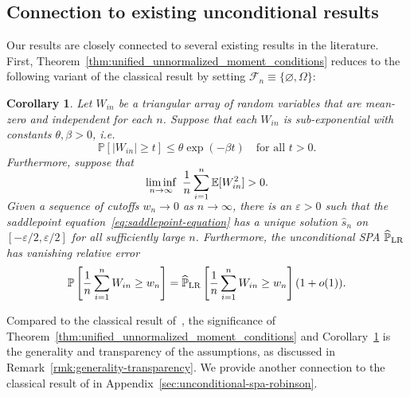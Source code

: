 \documentclass[12pt]{article}
\newtheorem{corollary}{Corollary}
\theoremstyle{definition}
\def\P{\mathbb{P}}
\def\P{\mathbb{P}}
\newcommand{\E}{\mathbb E}								%
\renewcommand{\P}{\mathbb{P}}							%
\begin{document}
  \subsection{Connection to existing unconditional results}\label{sec:connection-spa-literatures}
  
  Our results are closely connected to several existing results in the literature. First, Theorem~\ref{thm:unified_unnormalized_moment_conditions} reduces to the following variant of the classical \citet{Lugannani1980} result by setting $\mathcal{F}_n \equiv \{\varnothing,\Omega\}$:
  
  \begin{corollary}\label{cor:unconditional_LR_formula}
	  Let $W_{in}$ be a triangular array of random variables that are mean-zero and independent for each $n$. Suppose that each $W_{in}$ is sub-exponential with constants $\theta, \beta > 0$, i.e. 
	  \begin{equation} \label{eq:subexponential}
	  \P[|W_{in}| \geq t] \leq \theta \exp(-\beta t) \quad \text{for all } t > 0.
	  \end{equation} 
	  Furthermore, suppose that
	  \begin{align}  \label{eq:nondegeneracy-unconditional}
	  \smash{\liminf_{n \rightarrow \infty}\ \frac{1}{n}\sum_{i = 1}^n \E[W_{in}^2] > 0.}
	  \end{align}
	  Given a sequence of cutoffs $w_n \rightarrow 0$ as $n \rightarrow \infty$, there is an $\varepsilon > 0$ such that the saddlepoint equation~\eqref{eq:saddlepoint-equation} has a unique solution $\hat s_n$ on $[-\varepsilon/2, \varepsilon/2]$ for all sufficiently large $n$. Furthermore, the unconditional SPA $\widehat{\P}_{\textnormal{LR}}$ has vanishing relative error
	  \begin{align} \label{eq:conclusion_unconditional_saddlepoint_approximation}
	  \P\left[\frac{1}{n}\sum_{i = 1}^n W_{in} \geq w_n\right] = \widehat{\P}_{\textnormal{LR}}\left[\frac{1}{n}\sum_{i = 1}^n W_{in} \geq w_n\right](1+o(1)).
	  \end{align}
  \end{corollary}
  Compared to the classical result of~\citet{Lugannani1980}, the significance of Theorem~\ref{thm:unified_unnormalized_moment_conditions} and Corollary~\ref{cor:unconditional_LR_formula} is the generality and transparency of the assumptions, as discussed in Remark~\ref{rmk:generality-transparency}. We provide another connection to the classical result of \citet{Robinson1982} in Appendix~\ref{sec:unconditional-spa-robinson}.
  
\end{document}

